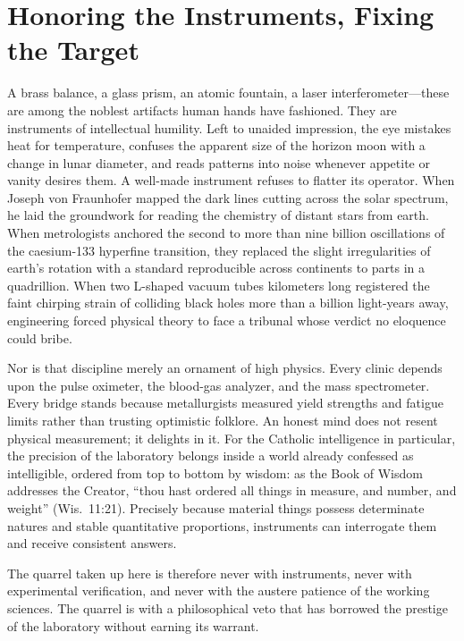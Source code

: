 \section{Honoring the Instruments, Fixing the Target}

A brass balance, a glass prism, an atomic fountain, a laser interferometer---these are among the noblest artifacts human hands have fashioned. They are instruments of intellectual humility. Left to unaided impression, the eye mistakes heat for temperature, confuses the apparent size of the horizon moon with a change in lunar diameter, and reads patterns into noise whenever appetite or vanity desires them. A well-made instrument refuses to flatter its operator. When Joseph von Fraunhofer mapped the dark lines cutting across the solar spectrum, he laid the groundwork for reading the chemistry of distant stars from earth. When metrologists anchored the second to more than nine billion oscillations of the caesium-133 hyperfine transition, they replaced the slight irregularities of earth's rotation with a standard reproducible across continents to parts in a quadrillion. When two L-shaped vacuum tubes kilometers long registered the faint chirping strain of colliding black holes more than a billion light-years away, engineering forced physical theory to face a tribunal whose verdict no eloquence could bribe.

Nor is that discipline merely an ornament of high physics. Every clinic depends upon the pulse oximeter, the blood-gas analyzer, and the mass spectrometer. Every bridge stands because metallurgists measured yield strengths and fatigue limits rather than trusting optimistic folklore. An honest mind does not resent physical measurement; it delights in it. For the Catholic intelligence in particular, the precision of the laboratory belongs inside a world already confessed as intelligible, ordered from top to bottom by wisdom: as the Book of Wisdom addresses the Creator, ``thou hast ordered all things in measure, and number, and weight'' (Wis.\ 11:21). Precisely because material things possess determinate natures and stable quantitative proportions, instruments can interrogate them and receive consistent answers.

The quarrel taken up here is therefore never with instruments, never with experimental verification, and never with the austere patience of the working sciences. The quarrel is with a philosophical veto that has borrowed the prestige of the laboratory without earning its warrant.

